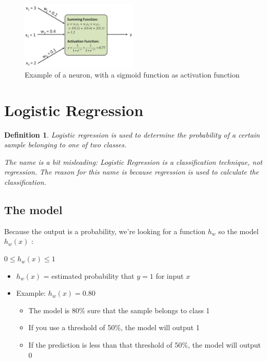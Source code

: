 \documentclass{article}
\newtheorem{theorem}{Definition}[section]
\begin{document}
\begin{figure}[H]
    \centering
    \includegraphics[width=0.5\textwidth]{neuron-voorbeeld.png}
    \caption{Example of a neuron, with a sigmoid function as activation function}
\end{figure}

\section{Logistic Regression}

\begin{theorem}
    Logistic regression is used to determine the probability of a certain sample 
    belonging to one of two classes.
    
    The name is a bit misleading: Logistic Regression is a classification technique, not regression. 
    The reason for this name is because regression is used to calculate the classification.
\end{theorem}

\subsection{The model}

Because the output is a probability, we're looking for a function $h_w$ so the model $h_w(x)$ :

\begin{center}
$0 \leq h_w(x) \leq 1$
\end{center}

\begin{itemize}
    \item $h_w(x)$ = estimated probability that $y=1$ for input $x$
    \item Example: $h_w(x) = 0.80$
    \begin{itemize}
        \item The model is 80\% sure that the sample belongs to class 1
        \item If you use a threshold of 50\%, the model will output 1
        \item If the prediction is less than that threshold of 50\%, the model will output 0
    \end{itemize}
\end{itemize}
\end{document}
